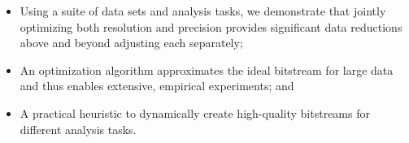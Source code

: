 \begin{itemize}

\item Using a suite of data sets and analysis tasks, we demonstrate
  that jointly optimizing both resolution and precision provides
  significant data reductions above and beyond  adjusting each
  separately;

\item An optimization algorithm approximates the ideal
  bitstream for large data and thus enables extensive, empirical
  experiments; and

\item A practical heuristic to dynamically create
  high-quality bitstreams for different analysis tasks.

\end{itemize}

 





